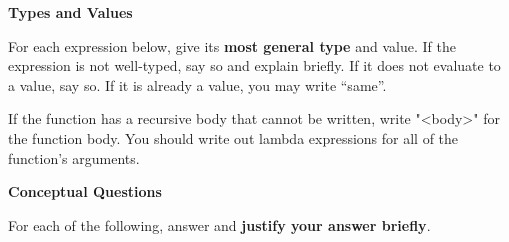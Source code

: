 
\def\practiceversion{}


\textbf{Types and Values}

For each expression below, give its \textbf{most general type} and value.
If the expression is not well-typed, say so and explain briefly. If it does not
evaluate to a value, say so. If it is already a value, you may write ``same''.

If the function has a recursive body that cannot be written, write "<body>" for
the function body. You should write out lambda expressions for all of the function's
arguments.

\begin{parts}

\end{parts}

\newpage
{}
\textbf{Conceptual Questions}

For each of the following, answer and \textbf{justify your answer briefly}.

\begin{parts}
\end{parts}

